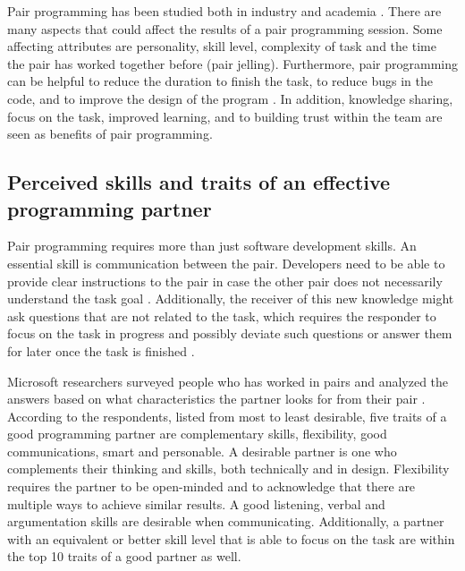 \documentclass[conference]{IEEEtran}
\begin{document}
Pair programming has been studied both in industry and academia \cite{Williams2000Strengthening, 10.1145/1414004.1414026, Hannay2009effectiveness}. There are many aspects that could affect the results of a pair programming session. Some affecting attributes are personality, skill level, complexity of task and the time the pair has worked together before (pair jelling). Furthermore, pair programming can be helpful to reduce the duration to finish the task, to reduce bugs in the code, and to improve the design of the program \cite{10.1145/2652524.2652529}. In addition, knowledge sharing, focus on the task, improved learning, and to building trust within the team are seen as benefits of pair programming.

\subsection{Perceived skills and traits of an effective programming partner}

Pair programming requires more than just software development skills. An essential skill is communication between the pair. Developers need to be able to provide clear instructions to the pair in case the other pair does not necessarily understand the task goal \cite{10.1145/2652524.2652529}. Additionally, the receiver of this new knowledge might ask questions that are not related to the task, which requires the responder to focus on the task in progress and possibly deviate such questions or answer them for later once the task is finished \cite{10.1145/2652524.2652529}. 

Microsoft researchers surveyed people who has worked in pairs and analyzed the answers based on what characteristics the partner looks for from their pair \cite{10.1145/1414004.1414026}. According to the respondents, listed from most to least desirable, five traits of a good programming partner are complementary skills, flexibility, good communications, smart and personable. A desirable partner is one who complements their thinking and skills, both technically and in design. Flexibility requires the partner to be open-minded and to acknowledge that there are multiple ways to achieve similar results. A good listening, verbal and argumentation skills are desirable when communicating. Additionally, a partner with an equivalent or better skill level that is able to focus on the task are within the top 10 traits of a good partner as well.
\end{document}
